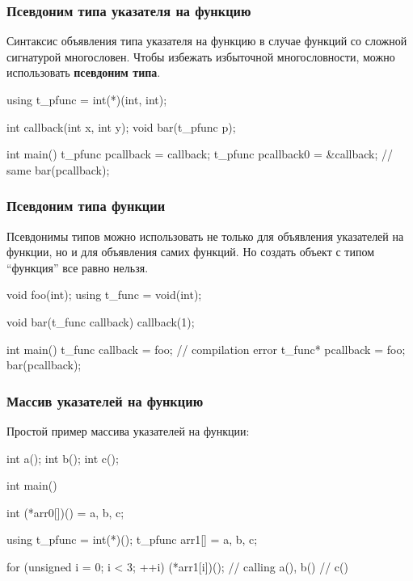 \documentclass[compress, 8pt, aspectratio=169]{beamer}
\begin{document}
\begin{frame}[fragile]

    \frametitle{Псевдоним типа указателя на функцию}

    Синтаксис объявления типа указателя на функцию в случае
    функций со сложной сигнатурой многословен.
    Чтобы избежать избыточной многословности, можно использовать
    \textbf{псевдоним типа}\footnotemark{}.


    \begin{myinplacelisting}[minted language=cpp]
using t_pfunc = int(*)(int, int);

int callback(int x, int y);
void bar(t_pfunc p);

int main() {
    t_pfunc pcallback = callback;
    t_pfunc pcallback0 = &callback; // same
    bar(pcallback);
}
    \end{myinplacelisting}

\end{frame}

\begin{frame}[fragile]

    \frametitle{Псевдоним типа функции}

    Псевдонимы типов можно использовать не только для
    объявления указателей на функции, но и для
    объявления самих функций.
    Но создать объект с типом \enquote{функция}
    все равно нельзя.

    \begin{myinplacelisting}[minted language=cpp]
void foo(int);
using t_func = void(int);

void bar(t_func callback) {
    callback(1);
}

int main() {
    t_func callback = foo; // compilation error
    t_func* pcallback = foo;
    bar(pcallback);
}
    \end{myinplacelisting}
    
\end{frame}

\begin{frame}[fragile]

    \frametitle{Массив указателей на функцию}

    Простой пример массива указателей на
    функции:

    \begin{myinplacelisting}[minted language=cpp]
int a(); int b(); int c();

int main() {
    int (*arr0[])() = {a, b, c};

    using t_pfunc = int(*)();
    t_pfunc arr1[] = {a, b, c};

    for (unsigned i = 0; i < 3; ++i) {
        (*arr1[i])(); // calling a(), b()
                      // c()
    }
}
    \end{myinplacelisting}

\end{frame}
\end{document}
